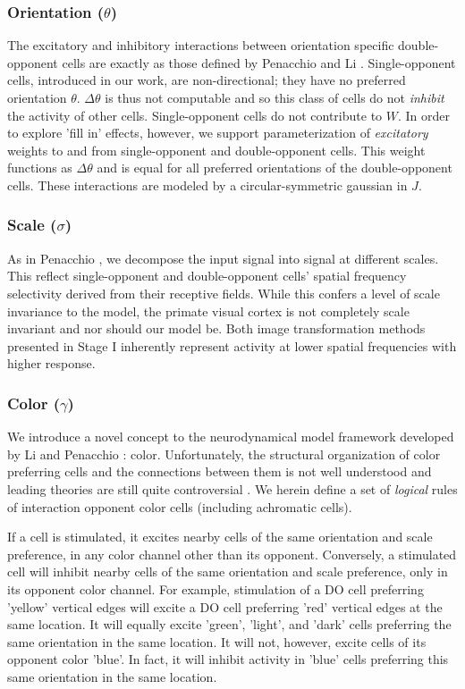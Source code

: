 \documentclass[journal,onecolumn]{IEEEtran}
\begin{document}
\subsubsection*{Orientation ($\theta$)}
The excitatory and inhibitory interactions between orientation specific double-opponent cells are exactly as those defined by Penacchio \cite{penacchio:2013} and Li \cite{li:1999}. Single-opponent cells, introduced in our work, are non-directional; they have no preferred orientation $\theta$. $\Delta\theta$ is thus not computable and so this class of cells do not \textit{inhibit} the activity of other cells. Single-opponent cells do not contribute to $W$. In order to explore 'fill in' effects, however, we support parameterization of \textit{excitatory} weights to and from single-opponent and double-opponent cells. This weight functions as $\Delta\theta$ and is equal for all preferred orientations of the double-opponent cells. These interactions are modeled by a circular-symmetric gaussian in $J$.

\subsubsection*{Scale ($\sigma$)}
As in Penacchio \cite{penacchio:2013}, we decompose the input signal into signal at different scales. This reflect single-opponent and double-opponent cells' spatial frequency selectivity derived from their receptive fields. While this confers a level of scale invariance to the model, the primate visual cortex is not completely scale invariant and nor should our model be. Both image transformation methods presented in Stage I inherently represent activity at lower spatial frequencies with higher response.

\subsubsection*{Color ($\gamma$)}
We introduce a novel concept to the neurodynamical model framework developed by Li \cite{li:1999} and Penacchio \cite{penacchio:2013}: color. Unfortunately, the structural organization of color preferring cells and the connections between them is not well understood and leading theories are still quite controversial \cite{shapley:2011}. We herein define a set of \textit{logical} rules of interaction opponent color cells (including achromatic cells).

If a cell is stimulated, it excites nearby cells of the same orientation and scale preference, in any color channel other than its opponent. Conversely, a stimulated cell will inhibit nearby cells of the same orientation and scale preference, only in its opponent color channel. For example, stimulation of a DO cell preferring 'yellow' vertical edges will excite a DO cell preferring 'red' vertical edges at the same location. It will equally excite 'green', 'light', and 'dark' cells preferring the same orientation in the same location. It will not, however, excite cells of its opponent color 'blue'. In fact, it will inhibit activity in 'blue' cells preferring this same orientation in the same location.
\end{document}
